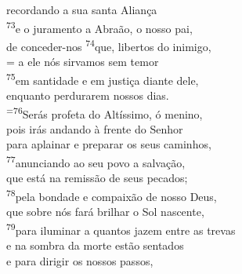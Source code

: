 \documentclass[opennany]{book}
\begin{document}
\begin{center}
    recordando a sua santa Aliança
    \vspace{.2cm} \\
    \textsuperscript{\underline{\hspace{.06in}}\textcolor{VioletRed2}{73}}e o juramento a Abraão, o nosso pai, \textsuperscript{\gresixstar{}} \\
    de conceder-nos \textsuperscript{\textcolor{VioletRed2}{74}}que, libertos do inimigo,
    \vspace{.2cm} \\
    = a ele nós sirvamos sem temor \dag{} \\
    \textsuperscript{\textcolor{VioletRed2}{75}}em santidade e em justiça diante dele, \textsuperscript{\gresixstar{}} \\
    enquanto perdurarem nossos dias.
    \vspace{.2cm} \\
    \textsuperscript{=\textcolor{VioletRed2}{76}}Serás profeta do Altíssimo, ó menino, \dag{} \\
    pois irás andando à frente do Senhor \textsuperscript{\gresixstar{}} \\
    para aplainar e preparar os seus caminhos,
    \vspace{.2cm} \\
    \textsuperscript{\underline{\hspace{.06in}}\textcolor{VioletRed2}{77}}anunciando ao seu povo a salvação, \textsuperscript{\gresixstar{}} \\
    que está na remissão de seus pecados;
    \vspace{.2cm} \\
    \textsuperscript{\underline{\hspace{.06in}}\textcolor{VioletRed2}{78}}pela bondade e compaixão de nosso Deus, \textsuperscript{\gresixstar{}} \\
    que sobre nós fará brilhar o Sol nascente,
    \vspace{.2cm} \\
    \textsuperscript{\underline{\hspace{.06in}}\textcolor{VioletRed2}{79}}para iluminar a quantos jazem entre as trevas \textsuperscript{\gresixstar{}} \\
    e na sombra da morte estão sentados
    \vspace{.2cm} \\
    \textsuperscript{\underline{\hspace{.06in}}} e para dirigir os nossos passos, \textsuperscript{\gresixstar{}} \\

\end{center}
\end{document}

